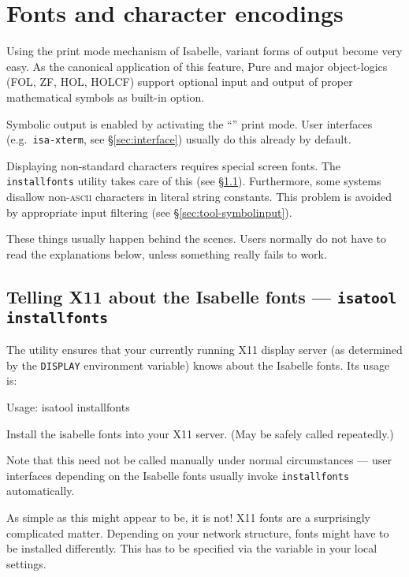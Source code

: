 

\chapter{Fonts and character encodings}

Using the print mode mechanism of Isabelle, variant forms of output become
very easy. As the canonical application of this feature, Pure and major
object-logics (FOL, ZF, HOL, HOLCF) support optional input and output of
proper mathematical symbols as built-in option.

Symbolic output is enabled by activating the ``'' print mode.
User interfaces (e.g.\ \texttt{isa-xterm}, see \S\ref{sec:interface}) usually
do this already by default.

\medskip Displaying non-standard characters requires special screen fonts. The
\texttt{installfonts} utility takes care of this (see
\S\ref{sec:tool-installfonts}). Furthermore, some {\ML} systems disallow
non-\textsc{ascii} characters in literal string constants.  This problem is
avoided by appropriate input filtering (see \S\ref{sec:tool-symbolinput}).

These things usually happen behind the scenes.  Users normally do not have to
read the explanations below, unless something really fails to work.


\section{Telling X11 about the Isabelle fonts --- \texttt{isatool installfonts}}
\label{sec:tool-installfonts}

The  utility ensures that your currently running X11
display server (as determined by the \texttt{DISPLAY} environment variable)
knows about the Isabelle fonts. Its usage is:
\begin{ttbox}
Usage: isatool installfonts

  Install the isabelle fonts into your X11 server.
  (May be safely called repeatedly.)
\end{ttbox}
Note that this need not be called manually under normal circumstances --- user
interfaces depending on the Isabelle fonts usually invoke
\texttt{installfonts} automatically.

\medskip As simple as this might appear to be, it is not! X11 fonts are a
surprisingly complicated matter. Depending on your network structure, fonts
might have to be installed differently. This has to be specified via the
 variable in your local settings.

